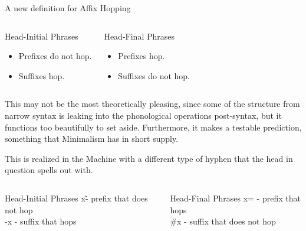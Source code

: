 \documentclass[10pt]{beamer}
\begin{document}
\begin{frame}[fragile]{A new definition for Affix Hopping}
  \pause
{}
  \begin{columns}[T,onlytextwidth]


      \begin{block}{Head-Initial Phrases}
        \begin{itemize}
          \item Prefixes do not hop.
          \item Suffixes hop.
        \end{itemize}
      \end{block}




      \begin{block}{Head-Final Phrases}
        \begin{itemize}
          \item Prefixes hop.
          \item Suffixes do not hop.
        \end{itemize}
      \end{block}

  \end{columns}

  \pause
  This may not be the most theoretically pleasing, since some of the structure from narrow syntax is leaking into the phonological operations post-syntax, but it functions too beautifully to set aside. Furthermore, it makes a testable prediction, something that Minimalism has in short supply.

  \pause
  This is realized in the Machine with a different type of hyphen that the head in question spells out with.


  \begin{columns}[T,onlytextwidth]


      \begin{block}{Head-Initial Phrases}
        x\~ - prefix that does not hop \\
        -x - suffix that hops
      \end{block}




      \begin{block}{Head-Final Phrases}
        x= - prefix that hops\\
        \#x - suffix that does not hop
      \end{block}

  \end{columns}

\end{frame}
\end{document}

